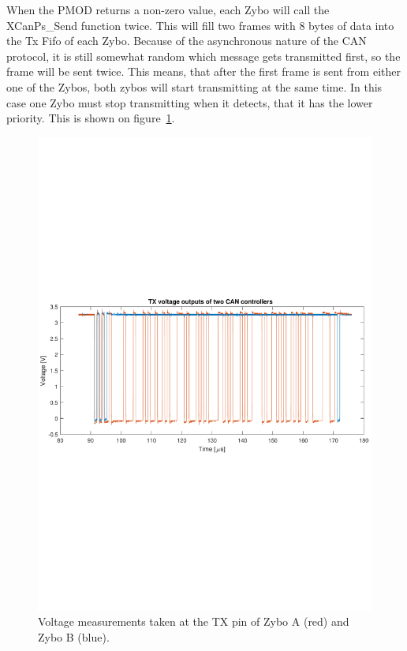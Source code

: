When the PMOD returns a non-zero value, each Zybo will call the XCanPs\_Send function twice.
This will fill two frames with 8 bytes of data into the Tx Fifo of each Zybo. 
Because of the asynchronous nature of the CAN protocol, it is still somewhat random which message gets transmitted first, so the frame will be sent twice. 
This means, that after the first frame is sent from either one of the Zybos, both zybos will start transmitting at the same time. 
In this case one Zybo must stop transmitting when it detects, that it has the lower priority.
This is shown on figure~\ref{fig:CAN_test3_2TX}.\\

\begin{figure}[h]
	\centering
	\includegraphics[width = \linewidth]{graphics/CAN_test3_2TX}
	\caption{Voltage measurements taken at the TX pin of Zybo A (red) and Zybo B (blue).}
	\label{fig:CAN_test3_2TX}
\end{figure}

